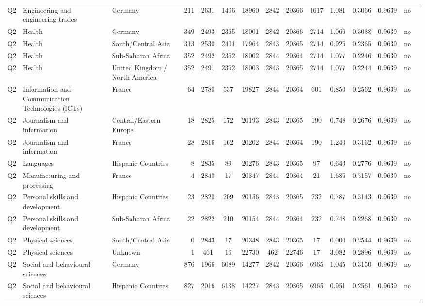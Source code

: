 \begin{longtable}{lllrcccccccccll}
Q2 & Engineering and engineering trades & Germany & 211 & 2631 & 1406 & 18960 & 2842 & 20366 & 1617 & 1.081 & 0.3066 & 0.9639 & no \\
Q2 & Health & Germany & 349 & 2493 & 2365 & 18001 & 2842 & 20366 & 2714 & 1.066 & 0.3038 & 0.9639 & no \\
Q2 & Health & South/Central Asia & 313 & 2530 & 2401 & 17964 & 2843 & 20365 & 2714 & 0.926 & 0.2365 & 0.9639 & no \\
Q2 & Health & Sub-Saharan Africa & 352 & 2492 & 2362 & 18002 & 2844 & 20364 & 2714 & 1.077 & 0.2246 & 0.9639 & no \\
Q2 & Health & United Kingdom / North America & 352 & 2491 & 2362 & 18003 & 2843 & 20365 & 2714 & 1.077 & 0.2244 & 0.9639 & no \\
Q2 & Information and Communication Technologies (ICTs) & France & 64 & 2780 & 537 & 19827 & 2844 & 20364 & 601 & 0.850 & 0.2562 & 0.9639 & no \\
Q2 & Journalism and information & Central/Eastern Europe & 18 & 2825 & 172 & 20193 & 2843 & 20365 & 190 & 0.748 & 0.2676 & 0.9639 & no \\
Q2 & Journalism and information & France & 28 & 2816 & 162 & 20202 & 2844 & 20364 & 190 & 1.240 & 0.3162 & 0.9639 & no \\
Q2 & Languages & Hispanic Countries & 8 & 2835 & 89 & 20276 & 2843 & 20365 & 97 & 0.643 & 0.2776 & 0.9639 & no \\
Q2 & Manufacturing and processing & France & 4 & 2840 & 17 & 20347 & 2844 & 20364 & 21 & 1.686 & 0.3157 & 0.9639 & no \\
Q2 & Personal skills and development & Hispanic Countries & 23 & 2820 & 209 & 20156 & 2843 & 20365 & 232 & 0.787 & 0.3143 & 0.9639 & no \\
Q2 & Personal skills and development & Sub-Saharan Africa & 22 & 2822 & 210 & 20154 & 2844 & 20364 & 232 & 0.748 & 0.2268 & 0.9639 & no \\
Q2 & Physical sciences & South/Central Asia & 0 & 2843 & 17 & 20348 & 2843 & 20365 & 17 & 0.000 & 0.2544 & 0.9639 & no \\
Q2 & Physical sciences & Unknown & 1 & 461 & 16 & 22730 & 462 & 22746 & 17 & 3.082 & 0.2896 & 0.9639 & no \\
Q2 & Social and behavioural sciences & Germany & 876 & 1966 & 6089 & 14277 & 2842 & 20366 & 6965 & 1.045 & 0.3150 & 0.9639 & no \\
Q2 & Social and behavioural sciences & Hispanic Countries & 827 & 2016 & 6138 & 14227 & 2843 & 20365 & 6965 & 0.951 & 0.2561 & 0.9639 & no \\

\end{longtable}
